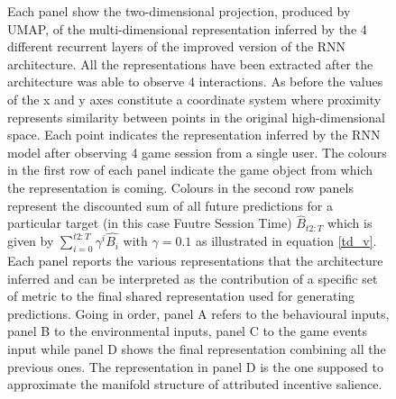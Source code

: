 \begin{figure}[ht]
\caption[\textbf{Lower dimensional representation of the latent representations generated by the improved version of the RNN architecture}]{Each panel show the two-dimensional projection, produced by UMAP, of the multi-dimensional representation inferred by the 4 different recurrent layers of the improved version of the RNN architecture. All the representations have been extracted after the architecture was able to observe 4 interactions. As before the values of the x and y axes constitute a coordinate system where proximity represents similarity between points in the original high-dimensional space. Each point indicates the representation inferred by the RNN model after observing 4 game session from a single user. The colours in the first row of each panel indicate the game object from which the representation is coming. Colours in the second row panels represent the discounted sum of all future predictions for a particular target (in this case Fuutre Session Time) $\widehat{B}_{t2:T}$ which is given by $\sum_{i=0}^{t2:T} \gamma^i\widehat{B_i}$ with $\gamma=0.1$ as illustrated in equation \ref{td_v}. Each panel reports the various representations that the architecture inferred and can be interpreted as the contribution of a specific set of metric to the final shared representation used for generating predictions. Going in order, panel A refers to the behavioural inputs, panel B to the environmental inputs, panel C to the game events input while panel D shows the final representation combining all the previous ones. The representation in panel D is the one supposed to approximate the manifold structure of attributed incentive salience.}
\label{full_panel_temporal_rnn_env_even}
\end{figure}

